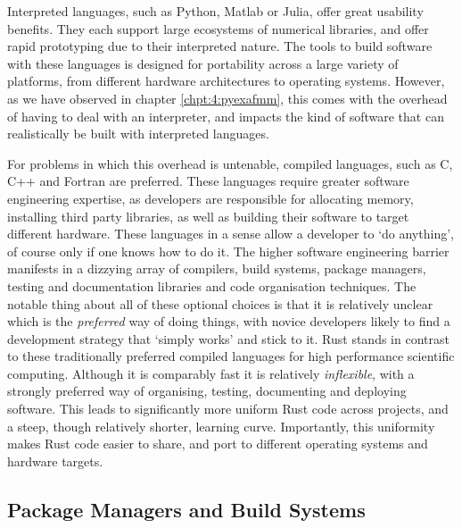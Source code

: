 Interpreted languages, such as Python, Matlab or Julia, offer great usability benefits. They each support large ecosystems of numerical libraries, and offer rapid prototyping due to their interpreted nature. The tools to build software with these languages is designed for portability across a large variety of platforms, from different hardware architectures to operating systems. However, as we have observed in chapter \ref{chpt:4:pyexafmm}, this comes with the overhead of having to deal with an interpreter, and impacts the kind of software that can realistically be built with interpreted languages.

For problems in which this overhead is untenable, compiled languages, such as C, C++ and Fortran are preferred. These languages require greater software engineering expertise, as developers are responsible for allocating memory, installing third party libraries, as well as building their software to target different hardware. These languages in a sense allow a developer to `do anything', of course only if one knows how to do it. The higher software engineering barrier manifests in a dizzying array of compilers, build systems, package managers, testing and documentation libraries and code organisation techniques. The notable thing about all of these optional choices is that it is relatively unclear which is the \textit{preferred} way of doing things, with novice developers likely to find a development strategy that `simply works' and stick to it. Rust stands in contrast to these traditionally preferred compiled languages for high performance scientific computing. Although it is comparably fast it is relatively \textit{inflexible}, with a strongly preferred way of organising, testing, documenting and deploying software. This leads to significantly more uniform Rust code across projects, and a steep, though relatively shorter, learning curve. Importantly, this uniformity makes Rust code easier to share, and port to different operating systems and hardware targets.

\subsection*{Package Managers and Build Systems}

